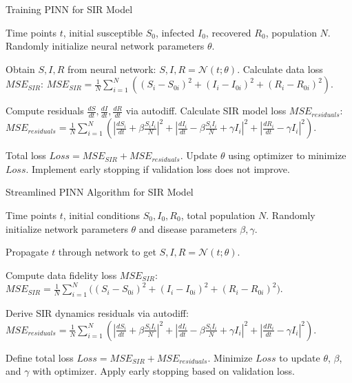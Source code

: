 \documentclass[12pt]{article}
\begin{document}
\begin{algorithm}
\caption{Training PINN for SIR Model}
\begin{algorithmic}[1]

\Require Time points $t$, initial susceptible $S_0$, infected $I_0$, recovered $R_0$, population $N$.
\State Randomly initialize neural network parameters $\theta$.

    \State Obtain $S, I, R$ from neural network: $S, I, R = \mathcal{N}(t; \theta)$.
    \State Calculate data loss $MSE_{SIR}$:
    \State $MSE_{SIR} = \frac{1}{N}\sum_{i=1}^{N} ((S_i - S_{0i})^2 + (I_i - I_{0i})^2 + (R_i - R_{0i})^2)$.
    
    \State Compute residuals $\frac{dS}{dt}, \frac{dI}{dt}, \frac{dR}{dt}$ via autodiff.
    \State Calculate SIR model loss $MSE_{residuals}$:
    \State $MSE_{residuals} = \frac{1}{N}\sum_{i=1}^{N} \left( \left|\frac{dS_i}{dt} + \beta \frac{S_i I_i}{N}\right|^2 + \left|\frac{dI_i}{dt} - \beta \frac{S_i I_i}{N} + \gamma I_i\right|^2 + \left|\frac{dR_i}{dt} - \gamma I_i\right|^2 \right)$.
    
    \State Total loss $Loss = MSE_{SIR} + MSE_{residuals}$.
    \State Update $\theta$ using optimizer to minimize $Loss$.
    \State Implement early stopping if validation loss does not improve.
\EndFor

\end{algorithmic}
\end{algorithm}

\begin{algorithm}
\caption{Streamlined PINN Algorithm for SIR Model}
\begin{algorithmic}[1]

\Require Time points $t$, initial conditions $S_0, I_0, R_0$, total population $N$.
\State Randomly initialize network parameters $\theta$ and disease parameters $\beta, \gamma$.

    \State Propagate $t$ through network to get $S, I, R = \mathcal{N}(t; \theta)$.
    
    \State Compute data fidelity loss $MSE_{SIR}$:
    \State $MSE_{SIR} = \frac{1}{N}\sum_{i=1}^{N} \big((S_i - S_{0i})^2 + (I_i - I_{0i})^2 + (R_i - R_{0i})^2\big)$.
    
    \State Derive SIR dynamics residuals via autodiff:
    \State $MSE_{residuals} = \frac{1}{N}\sum_{i=1}^{N} \left( \left|\frac{dS_i}{dt} + \beta \frac{S_i I_i}{N}\right|^2 + \left|\frac{dI_i}{dt} - \beta \frac{S_i I_i}{N} + \gamma I_i\right|^2 + \left|\frac{dR_i}{dt} - \gamma I_i\right|^2 \right)$.
    
    \State Define total loss $Loss = MSE_{SIR} + MSE_{residuals}$.
    \State Minimize $Loss$ to update $\theta$, $\beta$, and $\gamma$ with optimizer.
    \State Apply early stopping based on validation loss.
\EndFor

\end{algorithmic}
\end{algorithm}
\end{document}
